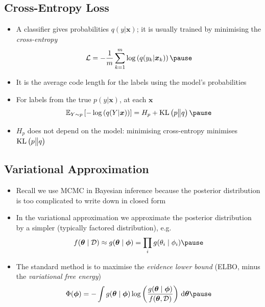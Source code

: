 \begin{slide}
\section[-2]{Cross-Entropy Loss}

\begin{PauseHighLight}
  \begin{itemize}\squeeze
  \item A classifier gives probabilities $q(y|\bm{x})$; it is usually
    trained by minimising the \emph{cross-entropy}
    \begin{align*}
      \mathcal{L} = -\frac{1}{m}\sum_{k=1}^m \logg{q(y_k|\bm{x}_k)}\pause
    \end{align*}
  \item It is the average code length for the labels using the model's
    probabilities\pause
  \item For labels from the true $p(y|\bm{x})$, at each $\bm{x}$
    \begin{align*}
      \av[Y\sim p]{-\logg{q(Y|\bm{x})}} = H_p + \KL{p}{q}\pause
    \end{align*}
  \item $H_p$ does not depend on the model: minimising cross-entropy
    minimises $\mathop{\mathrm{KL}}\left(p \big\| q\right)$\pause
  \end{itemize}
\end{PauseHighLight}

\end{slide}



\begin{slide}
\section{Variational Approximation}

\begin{PauseHighLight}
  \begin{itemize}
  \item Recall we use MCMC in Bayesian inference because the posterior
    distribution is too complicated to write down in closed form\pause
  \item In the variational approximation we approximate the posterior
    distribution by a simpler (typically factored distribution), e.g.
    \begin{align*}
      f(\bm{\theta}\mid\data) \approx g(\bm{\theta}\mid\bm{\phi}) = \prod_i
      g(\theta_i\mid\phi_i)\pause
    \end{align*}
  \item The standard method is to maximise the \emph{evidence lower
      bound} (ELBO, minus the \emph{variational free energy})
    \begin{align*}
      \Phi(\bm{\phi}) = -\int g(\bm{\theta}\mid\bm{\phi})
      \logg{\frac{g(\bm{\theta}\mid\bm{\phi})}{f(\bm{\theta}, \data)}} \,
      \dd \bm{\theta}\pause
    \end{align*}
  \end{itemize}
\end{PauseHighLight}

\end{slide}

